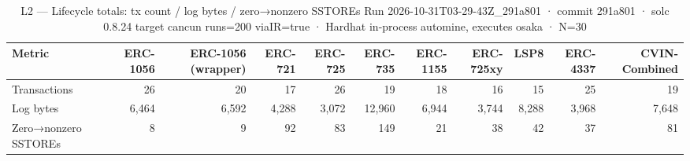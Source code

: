 \begin{table}[ht]
\centering
\small
\begin{tabular}{lrrrrrrrrrr}
\toprule
Metric & ERC-1056 & ERC-1056 (wrapper) & ERC-721 & ERC-725 & ERC-735 & ERC-1155 & ERC-725xy & LSP8 & ERC-4337 & CVIN-Combined \\
\midrule
Transactions & 26 & 20 & 17 & 26 & 19 & 18 & 16 & 15 & 25 & 19 \\
Log bytes & 6,464 & 6,592 & 4,288 & 3,072 & 12,960 & 6,944 & 3,744 & 8,288 & 3,968 & 7,648 \\
Zero→nonzero SSTOREs & 8 & 9 & 92 & 83 & 149 & 21 & 38 & 42 & 37 & 81 \\
\bottomrule
\end{tabular}
\caption{L2 — Lifecycle totals: tx count / log bytes / zero→nonzero SSTOREs Run 2026-10-31T03-29-43Z\_291a801 · commit 291a801 · solc 0.8.24 target cancun runs=200 viaIR=true · Hardhat in-process automine, executes osaka · N=30}
\label{tab:lifecycle_totals}
\end{table}
